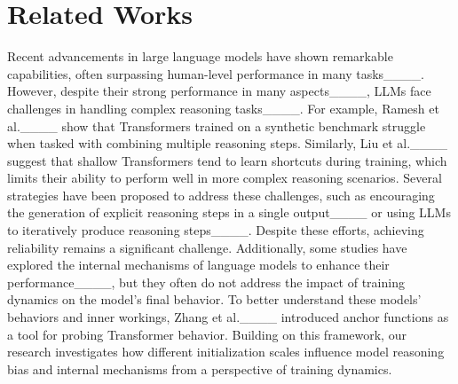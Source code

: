 \section{Related Works}


Recent advancements in large language models have shown remarkable capabilities, often surpassing human-level performance in many tasks____. However, despite their strong performance in many aspects____, LLMs face challenges in handling complex reasoning tasks____. For example, Ramesh et al.____ show that Transformers trained on a synthetic benchmark struggle when tasked with combining multiple reasoning steps. Similarly, Liu et al.____ suggest that shallow Transformers tend to learn shortcuts during training, which limits their ability to perform well in more complex reasoning scenarios. Several strategies have been proposed to address these challenges, such as encouraging the generation of explicit reasoning steps in a single output____ or using LLMs to iteratively produce reasoning steps____. Despite these efforts, achieving reliability remains a significant challenge. Additionally, some studies have explored the internal mechanisms of language models to enhance their performance____, but they often do not address the impact of training dynamics on the model's final behavior. To better understand these models' behaviors and inner workings, Zhang et al.____ introduced anchor functions as a tool for probing Transformer behavior. Building on this framework, our research investigates how different initialization scales influence model reasoning bias and internal mechanisms from a perspective of training dynamics.


